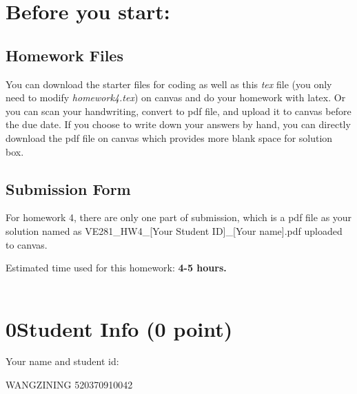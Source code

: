 \documentclass[11pt]{exam}
\newcommand{\hwnum}{4}
\begin{document}
\setlength{\parindent}{0pt}
\section*{Before you start:}

\subsection*{Homework Files}
You can download the starter files for coding as well as this \textit{tex} file (you only need to modify \textit{homework\hwnum.tex}) on canvas and do your homework with latex. Or you can scan your handwriting, convert to pdf file, and upload it to canvas before the due date. If you choose to write down your answers by hand, you can directly download the pdf file on canvas which provides more blank space for solution box.

\subsection*{Submission Form}
For homework \hwnum, there are only one part of submission, which is a pdf file as your solution named as VE281\_HW\hwnum\_[Your Student ID]\_[Your name].pdf uploaded to canvas.

Estimated time used for this homework: \textbf{4-5 hours.}
\\\\


\newpage
\section*{0\quad Student Info (0 point)}
Your name and student id:
\begin{solution}
    WANGZINING 520370910042
\end{solution}
\end{document}
